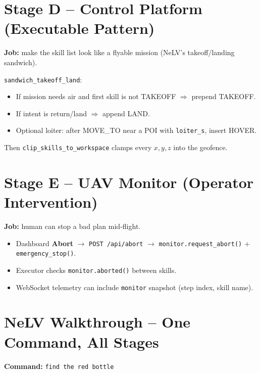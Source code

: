 \documentclass[11pt,a4paper]{article}
\begin{document}
\section{Stage D -- Control Platform (Executable Pattern)}

\textbf{Job:} make the skill list look like a flyable mission (NeLV's takeoff/landing sandwich).

\texttt{sandwich\_takeoff\_land}:
\begin{itemize}[itemsep=2pt]
\item If mission needs air and first skill is not TAKEOFF $\Rightarrow$ prepend TAKEOFF.
\item If intent is return/land $\Rightarrow$ append LAND.
\item Optional loiter: after MOVE\_TO near a POI with \texttt{loiter\_s}, insert HOVER.
\end{itemize}

Then \texttt{clip\_skills\_to\_workspace} clamps every $x,y,z$ into the geofence.

\section{Stage E -- UAV Monitor (Operator Intervention)}

\textbf{Job:} human can stop a bad plan mid-flight.

\begin{itemize}[itemsep=2pt]
\item Dashboard \textbf{Abort} $\to$ \texttt{POST /api/abort} $\to$
\texttt{monitor.request\_abort()} + \texttt{emergency\_stop()}.
\item Executor checks \texttt{monitor.aborted()} between skills.
\item WebSocket telemetry can include \texttt{monitor} snapshot (step index, skill name).
\end{itemize}

\section{NeLV Walkthrough -- One Command, All Stages}

\textbf{Command:} \texttt{find the red bottle}
\end{document}
